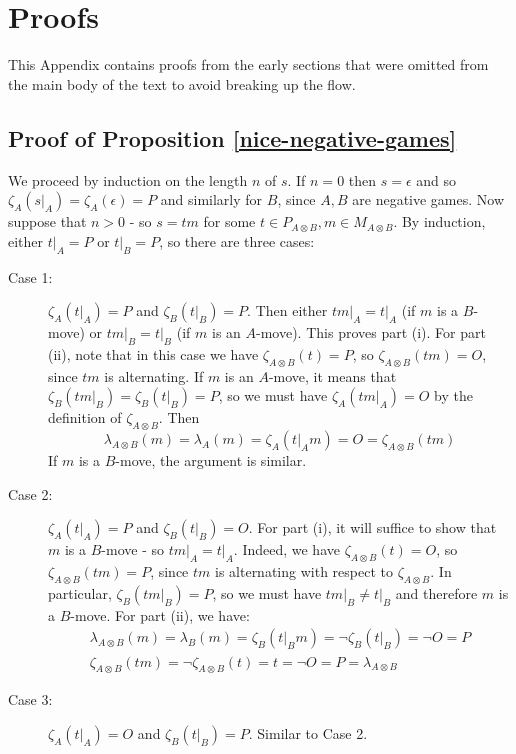 \documentclass[11pt]{article} %
\theoremstyle{plain} %
\theoremstyle{definition} %
\theoremstyle{note}
\theoremstyle{exercisestyle}
\newcommand{\tensor}{\otimes}
\newcommand{\emptyplay}{\epsilon}
\begin{document}
\appendix
{}

\section{Proofs}

This Appendix contains proofs from the early sections that were omitted from the main body of the text to avoid breaking up the flow.  

\subsection{Proof of Proposition \ref{nice-negative-games}}
\label{nice-negative-games-proof}

We proceed by induction on the length $n$ of $s$.  If $n=0$ then $s=\emptyplay$ and so $\zeta_A(s\vert_A)=\zeta_A(\emptyplay)=P$ and similarly for $B$, since $A,B$ are negative games.  Now suppose that $n>0$ - so $s=tm$ for some $t\in P_{A\tensor B},m\in M_{A\tensor B}$.  By induction, either $t\vert_A=P$ or $t\vert_B=P$, so there are three cases:
\begin{description}
  \item[Case 1:] $\zeta_A(t\vert_A)=P$ and $\zeta_B(t\vert_B)=P$. Then either $tm\vert_A=t\vert_A$ (if $m$ is a $B$-move) or $tm\vert_B=t\vert_B$ (if $m$ is an $A$-move).  This proves part (i).  For part (ii), note that in this case we have $\zeta_{A\tensor B}(t)=P$, so $\zeta_{A\tensor B}(tm)=O$, since $tm$ is alternating.  If $m$ is an $A$-move, it means that $\zeta_B(tm\vert_B)=\zeta_B(t\vert_B)=P$, so we must have $\zeta_A(tm\vert_A)=O$ by the definition of $\zeta_{A\tensor B}$.  Then
    \[
      \lambda_{A\tensor B}(m)=\lambda_A(m)=\zeta_A(t\vert_Am)=O=\zeta_{A\tensor B}(tm)
      \]
    If $m$ is a $B$-move, the argument is similar.
  \item[Case 2:] $\zeta_A(t\vert_A)=P$ and $\zeta_B(t\vert_B)=O$.  For part (i), it will suffice to show that $m$ is a $B$-move - so $tm\vert_A=t\vert_A$.  Indeed, we have $\zeta_{A\tensor B}(t)=O$, so $\zeta_{A\tensor B}(tm)=P$, since $tm$ is alternating with respect to $\zeta_{A\tensor B}$.  In particular, $\zeta_B(tm\vert_B)=P$, so we must have $tm\vert_B\ne t\vert_B$ and therefore $m$ is a $B$-move.  For part (ii), we have:
    \begin{gather*}
      \lambda_{A\tensor B}(m)=\lambda_B(m)=\zeta_B(t\vert_Bm)=\neg\zeta_B(t\vert_B)=\neg O = P \\
      \zeta_{A\tensor B}(tm)=\neg\zeta_{A\tensor B}(t)=t = \neg O = P = \lambda_{A\tensor B}
    \end{gather*}
  \item[Case 3:] $\zeta_A(t\vert_A)=O$ and $\zeta_B(t\vert_B)=P$.  Similar to Case 2.
\end{description}
\end{document}
